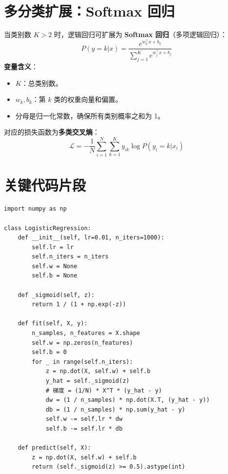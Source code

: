 \documentclass[12pt, a4paper]{book}
\begin{document}
\section{多分类扩展：Softmax 回归}
当类别数 $K > 2$ 时，逻辑回归可扩展为 \textbf{Softmax 回归}（多项逻辑回归）：
$$ P(y = k | x) = \frac{e^{w_k^\top x + b_k}}{\sum_{j=1}^K e^{w_j^\top x + b_j}} $$
\textbf{变量含义}：
\begin{itemize}
    \item $K$：总类别数。
    \item $w_k, b_k$：第 $k$ 类的权重向量和偏置。
    \item 分母是归一化常数，确保所有类别概率之和为 1。
\end{itemize}
对应的损失函数为\textbf{多类交叉熵}：
$$ \mathcal{L} = -\frac{1}{N} \sum_{i=1}^N \sum_{k=1}^K y_{ik} \log P(y_i = k | x_i) $$

\section{关键代码片段}
\begin{lstlisting}
import numpy as np

class LogisticRegression:
    def __init__(self, lr=0.01, n_iters=1000):
        self.lr = lr
        self.n_iters = n_iters
        self.w = None
        self.b = None

    def _sigmoid(self, z):
        return 1 / (1 + np.exp(-z))

    def fit(self, X, y):
        n_samples, n_features = X.shape
        self.w = np.zeros(n_features)
        self.b = 0
        for _ in range(self.n_iters):
            z = np.dot(X, self.w) + self.b
            y_hat = self._sigmoid(z)
            # 梯度 = (1/N) * X^T * (y_hat - y)
            dw = (1 / n_samples) * np.dot(X.T, (y_hat - y))
            db = (1 / n_samples) * np.sum(y_hat - y)
            self.w -= self.lr * dw
            self.b -= self.lr * db

    def predict(self, X):
        z = np.dot(X, self.w) + self.b
        return (self._sigmoid(z) >= 0.5).astype(int)
\end{lstlisting}
\end{document}
